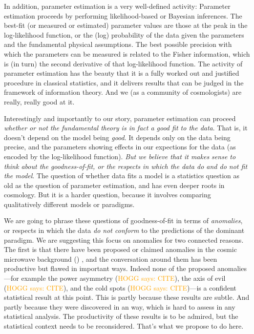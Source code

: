 \documentclass[12pt, fullpage, letterpaper]{article}
\newcommand{\HOGG}[1]{\textcolor{orange}{HOGG says: #1}}
\begin{document}
In addition, parameter estimation is a very well-defined activity:
Parameter estimation proceeds by performing likelihood-based or
Bayesian inferences.
The best-fit (or measured or estimated) parameter values are those at
the peak in the log-likelihood function, or the
(log) probability of the data given the parameters and the fundamental
physical assumptions.
The best possible precision with which the parameters can be measured
is related to the Fisher information, which is (in turn) the second
derivative of that log-likelihood function.
The activity of parameter estimation has the beauty that it is a fully
worked out and justified procedure in classical statistics, and it
delivers results that can be judged in the framework of information
theory.
And we (as a community of cosmologists) are really, really good at it.

Interestingly and importantly to our story,
parameter estimation can proceed \emph{whether or not the fundamental theory
is in fact a good fit to the data}.
That is, it doesn't depend on the model being \emph{good}.
It depends only on the data being precise, and the parameters showing
effects in our expections for the data (as encoded by the log-likelihood function).
\emph{But we believe that it makes sense to think about the goodness-of-fit,
or the respects in which the data do and do not fit the model}.
The question of whether data fits a model is a statistics question as old as the question of parameter estimation, and has even deeper roots in cosmology.
But it is a harder question, because it involves comparing
qualitatively different models or paradigms.

We are going to phrase these questions of goodness-of-fit in terms of
\emph{anomalies}, or respects in which the data \emph{do not conform}
to the predictions of the dominant paradigm.
We are suggesting this focus on anomalies for two connected reasons.
The first is that there have been proposed or claimed anomalies in the
cosmic microwave background (\CMB) \citep{Huterer2010}, and the conversation around them has been
productive but flawed in important ways.
Indeed none of the proposed anomalies---for example the power
asymmetry (\HOGG{CITE}), the axis of evil (\HOGG{CITE}), and the cold
spots (\HOGG{CITE})---is a confident statistical result at this point.
This is partly because these results are subtle. And partly because
they were discovered in an  way, which is hard to
assess in any  statistical analysis.
The productivity of these results is to be admired, but the statistical
context needs to be reconsidered. That's what we propose to do here.
\end{document}
